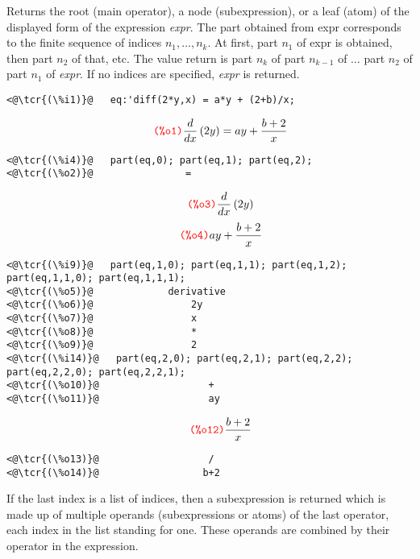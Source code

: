 \documentclass[../Maxima_Workbook.tex]{subfiles}
\begin{document}
\lzz {} \hfill \tcr{[function]}

\lz Returns the root (main operator), a node (subexpression), or a leaf (atom) of the displayed form of the expression \emph{expr}. The part obtained from expr corresponds to the finite sequence of indices $ n_1, \dots, n_k$. At first, part $ n_1 $ of expr is obtained, then part $ n_2 $ of that, etc. The value return is part $ n_k $ of part $ n_{k-1}$ of $\dots$ part $ n_2 $ of part $ n_1 $ of \emph{expr}. If no indices are specified, \emph{expr} is returned.

\lz \begin{small}
\color{blue} \leqn
\begin{lstlisting}
<@\tcr{(\%i1)}@   eq:'diff(2*y,x) = a*y + (2+b)/x;
\end{lstlisting}
\vspace{-4mm} \[\tag*{\tcr{\ttfamily (\%o1)}} \frac{d}{d x} \left( 2 y\right) =a y+\frac{b+2}{x}\]
\vspace{-6mm} 
\begin{lstlisting}
<@\tcr{(\%i4)}@   part(eq,0); part(eq,1); part(eq,2);
<@\tcr{(\%o2)}@			       =
\end{lstlisting}
\vspace{-4mm} \[\tag*{\tcr{\ttfamily (\%o3)}} \frac{d}{d x} \left( 2 y\right) \]
\vspace{-6mm} \[\tag*{\tcr{\ttfamily (\%o4)}} a y+\frac{b+2}{x} \]
\vspace{-6mm} 
\begin{lstlisting}
<@\tcr{(\%i9)}@   part(eq,1,0); part(eq,1,1); part(eq,1,2); part(eq,1,1,0); part(eq,1,1,1);
<@\tcr{(\%o5)}@			    derivative
<@\tcr{(\%o6)}@			        2y
<@\tcr{(\%o7)}@			        x
<@\tcr{(\%o8)}@			        *
<@\tcr{(\%o9)}@			        2
<@\tcr{(\%i14)}@   part(eq,2,0); part(eq,2,1); part(eq,2,2); part(eq,2,2,0); part(eq,2,2,1);
<@\tcr{(\%o10)}@			       +
<@\tcr{(\%o11)}@			       ay
\end{lstlisting}
\vspace{-4mm} \[\tag*{\tcr{\ttfamily (\%o12)}} \frac{b+2}{x} \]
\vspace{-6mm} 
\begin{lstlisting}
<@\tcr{(\%o13)}@			       /
<@\tcr{(\%o14)}@			      b+2
\end{lstlisting}
\color{black} \reqn
\end{small}

\lz If the last index is a list of indices, then a subexpression is returned which is made up of multiple operands (subexpressions or atoms) of the last operator, each index in the list standing for one. These operands are combined by their operator in the expression.
\end{document}
